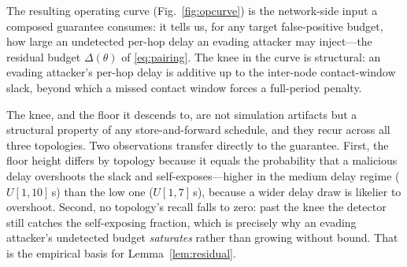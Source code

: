 The resulting operating curve (Fig.~\ref{fig:opcurve}) is the network-side input
a composed guarantee consumes: it tells us, for any target false-positive
budget, how large an undetected per-hop delay an evading attacker may
inject---the residual budget $\Delta(\theta)$ of \eqref{eq:pairing}. The knee in
the curve is structural: an evading attacker's per-hop delay is additive up to
the inter-node contact-window slack, beyond which a missed contact window forces
a full-period penalty.

The knee, and the floor it descends to, are not simulation artifacts but a
structural property of any store-and-forward schedule, and they recur across all
three topologies. Two observations transfer directly to the guarantee. First,
the floor height differs by topology because it equals the probability that a
malicious delay overshoots the slack and self-exposes---higher in the medium
delay regime ($U[1,10]$\,s) than the low one ($U[1,7]$\,s), because a wider
delay draw is likelier to overshoot. Second, no topology's recall falls to zero:
past the knee the detector still catches the self-exposing fraction, which is
precisely why an evading attacker's undetected budget \emph{saturates} rather
than growing without bound. That is the empirical basis for
Lemma~\ref{lem:residual}.

